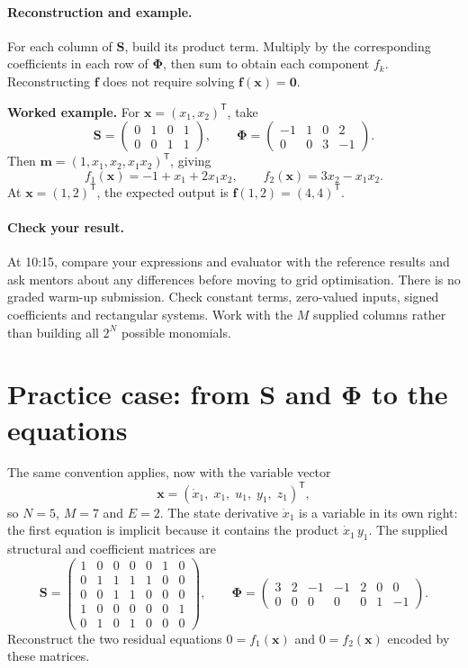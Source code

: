 \documentclass[10pt,a4paper]{article}
\begin{document}
\paragraph{Reconstruction and example.}
For each column of $\mathbf{S}$, build its product term. Multiply by the corresponding
coefficients in each row of $\boldsymbol{\Phi}$, then sum to obtain each component $f_k$. Reconstructing $\mathbf f$ does not
require solving $\mathbf f(\mathbf x)=\mathbf 0$.

\textbf{Worked example.} For $\mathbf x=(x_1,x_2)^\mathsf T$, take
\[
 \mathbf{S}=\begin{pmatrix}0&1&0&1\\0&0&1&1\end{pmatrix},\qquad
 \boldsymbol{\Phi}=\begin{pmatrix}-1&1&0&2\\0&0&3&-1\end{pmatrix}.
\]
Then $\mathbf m=(1,x_1,x_2,x_1x_2)^\mathsf T$, giving
\[
 \boxed{\quad f_1(\mathbf x)=-1+x_1+2x_1x_2,\qquad
 f_2(\mathbf x)=3x_2-x_1x_2.\quad}
\]
At $\mathbf x=(1,2)^\mathsf T$, the expected output is $\mathbf f(1,2)=(4,4)^\mathsf T$.

\paragraph{Check your result.}
At 10:15, compare your expressions and evaluator with the reference results and
ask mentors about any differences before moving to grid optimisation. There is
no graded warm-up submission. Check constant terms, zero-valued inputs, signed
coefficients and rectangular systems. Work with the $M$ supplied columns rather than
building all $2^N$ possible monomials.

\newpage
\section{Practice case: from \texorpdfstring{$\mathbf{S}$ and $\boldsymbol{\Phi}$}{S and Phi} to the equations}\label{sec:practice}
The same convention applies, now with the variable vector
\[
 \mathbf x=(\dot x_1,\;x_1,\;u_1,\;y_1,\;z_1)^\mathsf T,
\]
so $N=5$, $M=7$ and $E=2$. The state derivative $\dot x_1$ is a variable in its
own right: the first equation is implicit because it contains the product
$\dot x_1\,y_1$. The supplied structural and coefficient matrices are
\begingroup
\renewcommand{\arraystretch}{1.5}
\setlength{\arraycolsep}{8pt}
\[
 \mathbf{S}=\begin{pmatrix}
  1&0&0&0&0&1&0\\
  0&1&1&1&1&0&0\\
  0&0&1&1&0&0&0\\
  1&0&0&0&0&0&1\\
  0&1&0&1&0&0&0
 \end{pmatrix},\qquad
 \boldsymbol{\Phi}=\begin{pmatrix}
   3& 2&-1&-1& 2& 0& 0\\
   0& 0& 0& 0& 0& 1&-1
 \end{pmatrix}.
\]
\endgroup
Reconstruct the two residual equations $0=f_1(\mathbf x)$ and $0=f_2(\mathbf x)$
encoded by these matrices.
\end{document}
